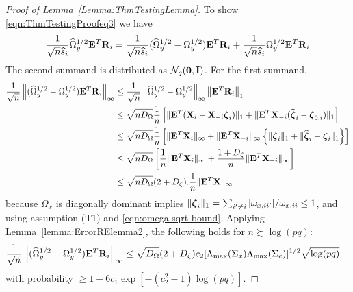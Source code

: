 \begin{proof}[Proof of Lemma~\ref{Lemma:ThmTestingLemma}]
To show \eqref{eqn:ThmTestingProofeq3} we have
%
\begin{align*}
\frac{1}{\sqrt n \widehat s_i}  \widehat \Omega_y^{1/2} {\mathbf{E}}^T {\mathbf{R}}_i =
\frac{1}{\sqrt n \widehat s_i}  (\widehat \Omega_y^{1/2} - \Omega_y^{1/2}) {\mathbf{E}}^T {\mathbf{R}}_i +
\frac{1}{\sqrt n \widehat s_i}  \Omega_y^{1/2} {\mathbf{E}}^T {\mathbf{R}}_i
\end{align*}
%
The second summand is distributed as ${\cal{N}}_q ({\bf 0}, {\mathbf{I}})$. For the first summand,
%
\begin{align*}
\frac{1}{\sqrt n}  \left\| (\widehat \Omega_y^{1/2} - \Omega_y^{1/2}) {\mathbf{E}}^T {\mathbf{R}}_i \right\|_\infty & \leq
\frac{1}{\sqrt n}  \left\| \widehat \Omega_y^{1/2} - \Omega_y^{1/2} \right\|_\infty  \left\| {\mathbf{E}}^T {\mathbf{R}}_i \right\|_1 \\
& \leq \sqrt{n D_\Omega} \frac{1}{n} \left[ \| {\mathbf{E}}^T ({\mathbf{X}}_i -  {\mathbf{X}}_{-i} {\boldsymbol{\zeta}}_i ) \|_1 + \| {\mathbf{E}}^T {\mathbf{X}}_{-i} (\widehat {{\boldsymbol{\zeta}}}_i - {\boldsymbol{\zeta}}_{0,i} ) \|_1 \right] \\
& \leq \sqrt{n D_\Omega} \frac{1}{n} \left[ \| {\mathbf{E}}^T {\mathbf{X}}_i \|_\infty + \| {\mathbf{E}}^T {\mathbf{X}}_{-i} \|_\infty
\left\{ \| {\boldsymbol{\zeta}}_i  \|_1 + \| \widehat {{\boldsymbol{\zeta}}}_i - {\boldsymbol{\zeta}}_i  \|_1 \right\} \right] \notag\\
& \leq \sqrt{n D_\Omega} \left[ \frac{1}{n} \| {\mathbf{E}}^T {\mathbf{X}}_i \|_\infty + 
\frac{1 + D_\zeta}{n} \| {\mathbf{E}}^T {\mathbf{X}}_{-i} \|_\infty \right] \\
& \leq \sqrt{n D_\Omega} (2 + D_\zeta) .\frac{1}{n} \| {\mathbf{E}}^T {\mathbf{X}} \|_\infty
\end{align*}
%
because $\Omega_x$ is diagonally dominant implies $\| {\boldsymbol{\zeta}}_i \|_1 = \sum_{i' \neq i} |\omega_{x,ii'}|/ \omega_{x,ii} \leq 1$, and using assumption (T1) and \eqref{eqn:omega-sqrt-bound}. Applying Lemma~\ref{lemma:ErrorRElemma2}, the following holds for $n \succsim \log (pq)$:
%
\begin{align}\label{eqn:ThmTestingProofeq31}
\frac{1}{\sqrt n}  \left\| (\widehat \Omega_y^{1/2} - \Omega_y^{1/2}) {\mathbf{E}}^T {\mathbf{R}}_i \right\|_\infty & \leq \sqrt{ D_\Omega} (2 + D_\zeta) c_2 [ \Lambda_{\max} (\Sigma_x) \Lambda_{\max} (\Sigma_e) ]^{1/2} \sqrt{ \log(pq)}
\end{align}
%
with probability $ \geq 1 - 6c_1 \exp [-(c_2^2-1) \log(pq)]$.


\end{proof}
